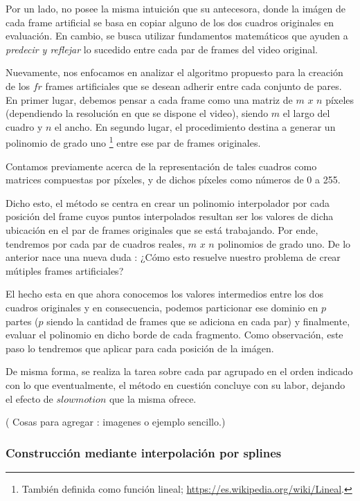 Por un lado, no posee la misma intuici\'on que su antecesora, donde la im\'agen de cada frame artificial se basa en copiar alguno de los dos cuadros originales en evaluaci\'on. En cambio, se busca utilizar fundamentos matem\'aticos que ayuden a \emph{predecir y reflejar} lo sucedido entre cada par de frames del video original. 

Nuevamente, nos enfocamos en analizar el algoritmo propuesto para la creaci\'on de los $fr$ frames artificiales que se desean adherir entre cada conjunto de pares. En primer lugar, debemos pensar a cada frame como una matriz de $m$ $x$ $n$ p\'ixeles (dependiendo la resoluci\'on en que se dispone el video), siendo $m$ el largo del cuadro y $n$ el ancho. En segundo lugar, el procedimiento destina a generar un polinomio de grado uno \footnote{ Tambi\'en definida como funci\'on lineal; \url{https://es.wikipedia.org/wiki/Lineal}.} entre ese par de frames originales.

Contamos previamente acerca de la representación de tales cuadros como matrices compuestas por p\'ixeles, y de dichos píxeles como números de 0 a 255.

Dicho esto, el m\'etodo se centra en crear un polinomio interpolador por cada posici\'on del frame cuyos puntos interpolados resultan ser los valores de dicha ubicaci\'on en el par de frames originales que se est\'a trabajando. Por ende, tendremos por cada par de cuadros reales, $m$ $x$ $n$ polinomios de grado uno. De lo anterior nace una nueva duda : ¿C\'omo esto resuelve nuestro problema de crear m\'utiples frames artificiales?

El hecho esta en que ahora conocemos los valores intermedios entre los dos cuadros originales y en consecuencia, podemos particionar ese dominio en $p$ partes ($p$ siendo la cantidad de frames que se adiciona en cada par) y finalmente, evaluar el polinomio en dicho borde de cada fragmento. Como observaci\'on, este paso lo tendremos que aplicar para cada posici\'on de la im\'agen.

De misma forma, se realiza la tarea sobre cada par agrupado en el orden indicado con lo que eventualmente, el m\'etodo en cuesti\'on concluye con su labor, dejando el efecto de $slowmotion$ que la misma ofrece.

( Cosas para agregar : imagenes o ejemplo sencillo.)

\subsubsection{Construcción mediante interpolación por splines}